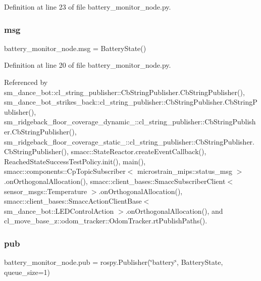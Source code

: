 Definition at line 23 of file battery\+\_\+monitor\+\_\+node.\+py.

\mbox{\label{namespacebattery__monitor__node_ab1920c64448816edd4064e494275fdff}} 
\subsubsection{\texorpdfstring{msg}{msg}}
{\footnotesize\ttfamily battery\+\_\+monitor\+\_\+node.\+msg = Battery\+State()}



Definition at line 20 of file battery\+\_\+monitor\+\_\+node.\+py.



Referenced by sm\+\_\+dance\+\_\+bot\+::cl\+\_\+string\+\_\+publisher\+::\+Cb\+String\+Publisher.\+Cb\+String\+Publisher(), sm\+\_\+dance\+\_\+bot\+\_\+strikes\+\_\+back\+::cl\+\_\+string\+\_\+publisher\+::\+Cb\+String\+Publisher.\+Cb\+String\+Publisher(), sm\+\_\+ridgeback\+\_\+floor\+\_\+coverage\+\_\+dynamic\+\_\+::cl\+\_\+string\+\_\+publisher\+::\+Cb\+String\+Publisher.\+Cb\+String\+Publisher(), sm\+\_\+ridgeback\+\_\+floor\+\_\+coverage\+\_\+static\+\_\+::cl\+\_\+string\+\_\+publisher\+::\+Cb\+String\+Publisher.\+Cb\+String\+Publisher(), smacc\+::\+State\+Reactor.\+create\+Event\+Callback(), Reached\+State\+Success\+Test\+Policy.\+init(), main(), smacc\+::components\+::\+Cp\+Topic\+Subscriber$<$ microstrain\+\_\+mips\+::status\+\_\+msg $>$.\+on\+Orthogonal\+Allocation(), smacc\+::client\+\_\+bases\+::\+Smacc\+Subscriber\+Client$<$ sensor\+\_\+msgs\+::\+Temperature $>$.\+on\+Orthogonal\+Allocation(), smacc\+::client\+\_\+bases\+::\+Smacc\+Action\+Client\+Base$<$ sm\+\_\+dance\+\_\+bot\+::\+L\+E\+D\+Control\+Action $>$.\+on\+Orthogonal\+Allocation(), and cl\+\_\+move\+\_\+base\+\_\+z\+::odom\+\_\+tracker\+::\+Odom\+Tracker.\+rt\+Publish\+Paths().

\mbox{\label{namespacebattery__monitor__node_ab13957b56951b692f19d70ccac2e2511}} 
\subsubsection{\texorpdfstring{pub}{pub}}
{\footnotesize\ttfamily battery\+\_\+monitor\+\_\+node.\+pub = rospy.\+Publisher(\char`\"{}battery\char`\"{}, Battery\+State, queue\+\_\+size=1)}



